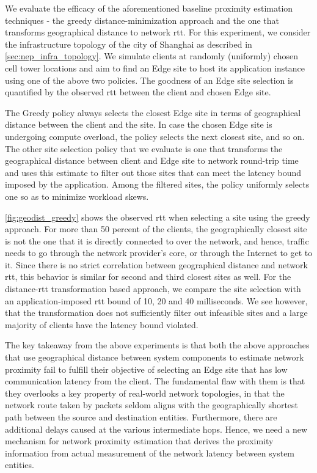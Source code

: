 \par We evaluate the efficacy of the aforementioned baseline proximity estimation techniques - the greedy distance-minimization approach and the one that transforms geographical distance to network \gls{rtt}. For this experiment, we consider the infrastructure topology of the city of Shanghai as described in \cref{sec:nep_infra_topology}. We simulate clients at randomly (uniformly) chosen cell tower locations and aim to find an Edge site to host its application instance using one of the above two policies. The goodness of an Edge site selection is quantified by the observed \gls{rtt} between the client and chosen Edge site. 
\par The Greedy policy always selects the closest Edge site in terms of geographical distance between the client and the site. In case the chosen Edge site is undergoing compute overload, the policy selects the next closest site, and so on. The other site selection policy that we evaluate is one that transforms the geographical distance between client and Edge site to network round-trip time and uses this estimate to filter out those sites that can meet the latency bound imposed by the application. Among the filtered sites, the policy uniformly selects one so as to minimize workload skews.
\par \cref{fig:geodist_greedy} shows the observed \gls{rtt} when selecting a site using the greedy approach. For more than 50 percent of the clients, the geographically closest site is not the one that it is directly connected to over the network, and hence, traffic needs to go through the network provider's core, or through the Internet to get to it. Since there is no strict correlation between geographical distance and network \gls{rtt}, this behavior is similar for second and third closest sites as well. For the distance-\gls{rtt} transformation based approach, we compare the site selection with an application-imposed \gls{rtt} bound of 10, 20 and 40 milliseconds. We see however, that the transformation does not sufficiently filter out infeasible sites and a large majority of clients have the latency bound violated.
\par The key takeaway from the above experiments is that both the above approaches that use geographical distance between system components to estimate network proximity fail to fulfill their objective of selecting an Edge site that has low communication latency from the client. The fundamental flaw with them is that they overlooks a key property of real-world network topologies, in that the network route taken by packets seldom aligns with the geographically shortest path between the source and destination entities. Furthermore, there are additional delays caused at the various intermediate hops. Hence, we need a new mechanism for network proximity estimation that derives the proximity information from actual measurement of the network latency between system entities.

